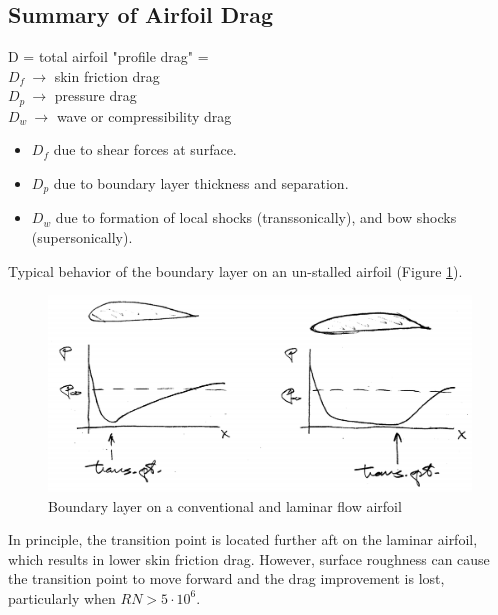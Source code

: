 \documentclass[draft=false, titlepage]{article}
\begin{document}
\subsection{Summary of Airfoil Drag}
D = total airfoil "profile drag" = \\
\indent $D_f\ \rightarrow$ skin friction drag\\
\indent $D_p\ \rightarrow$ pressure drag\\
\indent $D_w\ \rightarrow$ wave or compressibility drag
\begin{itemize}
	\item $D_f$ due to shear forces at surface.
	\item $D_p$ due to boundary layer thickness and separation.
	\item $D_w$ due to formation of local shocks (transsonically), and bow shocks (supersonically).
\end{itemize}

Typical behavior of the boundary layer on an un-stalled airfoil (Figure \ref{fig:p53_boundaryOnAirfoil}).
	
\begin{figure}[ht]
	\centering
	\includegraphics[width=0.8\linewidth]{Figures/p53_boundaryOnAirfoil.PNG}
	\caption{Boundary layer on a conventional and laminar flow airfoil}
	\label{fig:p53_boundaryOnAirfoil}
\end{figure}

In principle, the transition point is located further aft on the laminar airfoil, which results in lower skin friction drag. However, surface roughness can cause the transition point to move forward and the drag improvement is lost, particularly when $RN > 5\cdot 10^6$.
\end{document}
